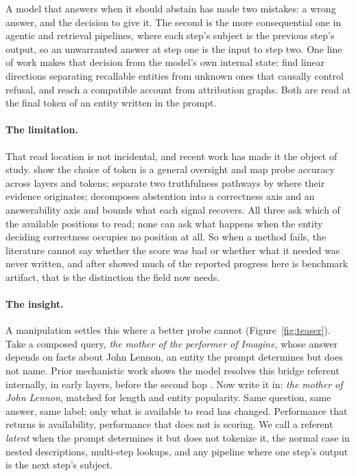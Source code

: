 \documentclass{article}
\begin{document}
A model that answers when it should abstain has made two mistakes: a wrong answer, and the decision to
give it. The second is the more consequential one in agentic and retrieval pipelines, where each
step's subject is the previous step's output, so an unwarranted answer at step one is the input to
step two. One line of work makes that decision from the model's own internal state:
\citet{ferrando2025entity} find linear directions separating recallable entities from unknown ones
that causally control refusal, and \citet{lindsey2025biology} reach a compatible account from
attribution graphs. Both are read at the final token of an entity written in the prompt.

\paragraph{The limitation.} That read location is not incidental, and recent work has made it the
object of study. \citet{orgad2025intrinsic} show the choice of token is a general oversight and map
probe accuracy across layers and tokens; \citet{luo2026pathways} separate two truthfulness pathways by
where their evidence originates; \citet{wagner2026twoaxes} decomposes abstention into a correctness
axis and an answerability axis and bounds what each signal recovers. All three ask which of the
available positions to read; none can ask what happens when the entity deciding correctness occupies
no position at all. So when a method fails, the literature cannot say whether the score was bad or
whether what it needed was never written, and after \citet{hussain2026parallax} showed much of the
reported progress here is benchmark artifact, that is the distinction the field now needs.

\paragraph{The insight.} A manipulation settles this where a better probe cannot
(Figure~\ref{fig:teaser}). Take a composed query, \emph{the mother of the performer of Imagine}, whose answer depends on facts
about John Lennon, an entity the prompt determines but does not name. Prior mechanistic work shows the
model resolves this bridge referent internally, in early layers, before the second hop
\citep{yang2024latent,biran2024hopping}. Now write it in: \emph{the mother of John Lennon}, matched for length and entity popularity. Same
question, same answer, same label; only what is available to read has changed. Performance that
returns is availability, performance that does not is scoring. We call a referent \emph{latent} when
the prompt determines it but does not tokenize it, the normal case in nested descriptions, multi-step
lookups, and any pipeline where one step's output is the next step's subject.
\end{document}
